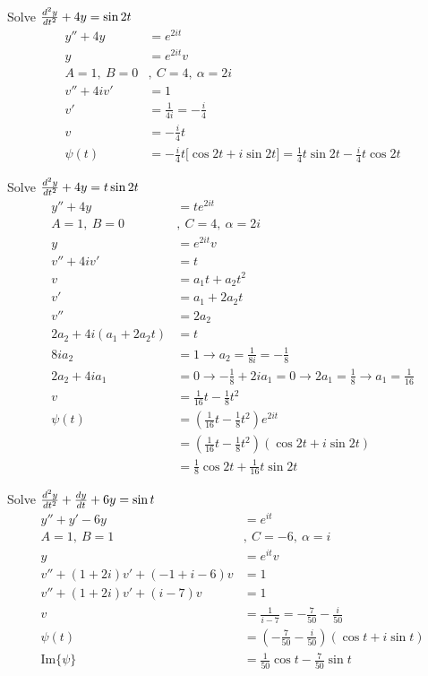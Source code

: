 \documentclass[12pt]{article}
\begin{document}
\begin{example} Solve $\frac{d^2y}{dt^2} + 4y = \sin 2t $ $$\begin{aligned} y'' + 4y &= e^{2it} \\ y &= e^{2it}v \\ A = 1, ~ B = 0 &, ~C = 4, ~\alpha = 2i \\ v'' + 4iv' &= 1 \\ v' &= \frac{1}{4i} = -\frac{i}{4} \\ v &= -\frac{i}{4}t \\ \psi(t) &= -\frac{i}{4}t\Big[\cos 2t + i\sin 2t\Big] = \frac{1}{4}t\sin 2t - \frac{i}{4}t\cos 2t \end{aligned} $$ \end{example}

\begin{example} Solve $\frac{d^2y}{dt^2} + 4y = t\sin 2t$ $$\begin{aligned} y'' + 4y &= te^{2it} \\ A = 1, ~ B = 0 &, ~C = 4, ~\alpha = 2i \\ y &= e^{2it}v \\ v'' + 4iv' &= t \\ v &= a_1t + a_2t^2 \\ v' &= a_1 + 2a_2t \\ v'' &= 2a_2 \\ 2a_2 + 4i(a_1 + 2a_2t) &= t \\ 8ia_2 &= 1 \to a_2 = \frac{1}{8i} = -\frac{1}{8} \\ 2a_2 + 4ia_1 &= 0 \to -\frac{1}{8} + 2ia_1 = 0 \to 2a_1 = \frac{1}{8} \to a_1 = \frac{1}{16} \\ v &= \frac{1}{16}t - \frac{1}{8}t^2 \\ \psi(t) &= (\frac{1}{16}t - \frac{1}{8}t^2)e^{2it} \\ &= (\frac{1}{16}t - \frac{1}{8}t^2)(\cos 2t + i\sin 2t) \\ &= \frac{1}{8}\cos 2t + \frac{1}{16}t\sin 2t \end{aligned} $$ \end{example} 

\begin{example} Solve $\frac{d^2y}{dt^2} + \frac{dy}{dt} + 6y = \sin t$ $$\begin{aligned} y'' + y' - 6y &= e^{it} \\ A = 1, ~ B = 1 &, ~C = -6, ~\alpha = i \\ y &= e^{it}v \\ v'' + (1 + 2i)v' + (-1 + i - 6)v &= 1 \\ v'' + (1 + 2i)v' + (i - 7)v &= 1 \\ v &= \frac{1}{i - 7} = -\frac{7}{50} - \frac{i}{50} \\ \psi(t) &= (-\frac{7}{50} - \frac{i}{50})(\cos t + i\sin t) \\ \text{Im}\{\psi\} &= \frac{1}{50}\cos t - \frac{7}{50}\sin t \end{aligned} $$ \end{example} 
\end{document}
